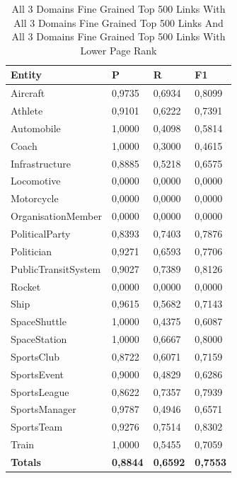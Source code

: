 \documentclass[thesis=M,english]{FITthesis}[2018/05/30]
\begin{document}
\begin{table}[H]\centering
		\label{}
		\begin{tabular}{|l|l|l|l|}
			\hline {\textbf{Entity}} & {\textbf{P}} & {\textbf{R}} & {\textbf{F1}}\\\hline
				Aircraft & 0,9735 & 0,6934 & 0,8099\\
				Athlete & 0,9101 & 0,6222 & 0,7391\\
				Automobile & 1,0000 & 0,4098 & 0,5814\\ 
				Coach & 1,0000 & 0,3000 & 0,4615\\
				Infrastructure & 0,8885 & 0,5218 & 0,6575\\
				Locomotive & 0,0000 & 0,0000 & 0,0000\\
				Motorcycle & 0,0000 & 0,0000 & 0,0000\\
				OrganisationMember & 0,0000 & 0,0000 & 0,0000\\				
				PoliticalParty & 0,8393 & 0,7403 & 0,7876\\
				Politician & 0,9271 & 0,6593 & 0,7706\\
				PublicTransitSystem & 0,9027 & 0,7389 & 0,8126\\
				Rocket & 0,0000 & 0,0000 & 0,0000\\				
				Ship & 0,9615 & 0,5682 & 0,7143\\
				SpaceShuttle & 1,0000 & 0,4375 & 0,6087\\
				SpaceStation & 1,0000 & 0,6667 & 0,8000\\ 
				SportsClub & 0,8722 & 0,6071 & 0,7159\\
				SportsEvent & 0,9000 & 0,4829 & 0,6286\\
				SportsLeague & 0,8622 & 0,7357 & 0,7939\\
				SportsManager & 0,9787 & 0,4946 & 0,6571\\
				SportsTeam & 0,9276 & 0,7514 & 0,8302\\
				Train & 1,0000 & 0,5455 & 0,7059\\\hline
				\textbf{Totals} & \textbf{0,8844} & \textbf{0,6592} & \textbf{0,7553}\\\hline
		\end{tabular}
		\caption{All 3 Domains Fine Grained Top 500 Links  With All 3 Domains Fine Grained Top 500 Links And All 3 Domains Fine Grained Top 500 Links With Lower Page Rank}
	\end{table}
\end{document}
